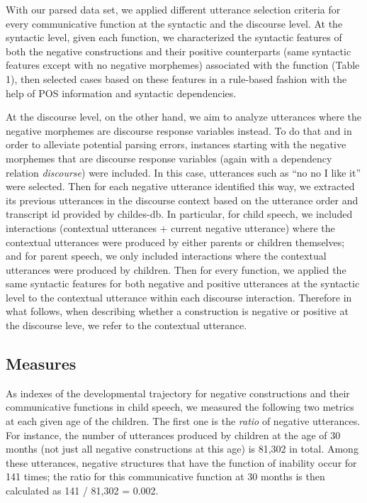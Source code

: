\documentclass[
  english,
  man,floatsintext]{apa6}
\begin{document}
With our parsed data set, we applied different utterance selection criteria for every communicative function at the syntactic and the discourse level. At the syntactic level, given each function, we characterized the syntactic features of both the negative constructions and their positive counterparts (same syntactic features except with no negative morphemes) associated with the function (Table 1), then selected cases based on these features in a rule-based fashion with the help of POS information and syntactic dependencies.

At the discourse level, on the other hand, we aim to analyze utterances where the negative morphemes are discourse response variables instead. To do that and in order to alleviate potential parsing errors, instances starting with the negative morphemes that are discourse response variables (again with a dependency relation \emph{discourse}) were included. In this case, utterances such as ``no no I like it'' were selected. Then for each negative utterance identified this way, we extracted its previous utterances in the discourse context based on the utterance order and transcript id provided by childes-db. In particular, for child speech, we included interactions (contextual utterances + current negative utterance) where the contextual utterances were produced by either parents or children themselves; and for parent speech, we only included interactions where the contextual utterances were produced by children. Then for every function, we applied the same syntactic features for both negative and positive utterances at the syntactic level to the contextual utterance within each discourse interaction. Therefore in what follows, when describing whether a construction is negative or positive at the discourse leve, we refer to the contextual utterance.

\hypertarget{measures}{%
\subsection{Measures}\label{measures}}

As indexes of the developmental trajectory for negative constructions and their communicative functions in child speech, we measured the following two metrics at each given age of the children. The first one is the \emph{ratio} of negative utterances. For instance, the number of utterances produced by children at the age of 30 months (not just all negative constructions at this age) is 81,302 in total. Among these utterances, negative structures that have the function of inability occur for 141 times; the ratio for this communicative function at 30 months is then calculated as 141 / 81,302 = 0.002.
\end{document}
